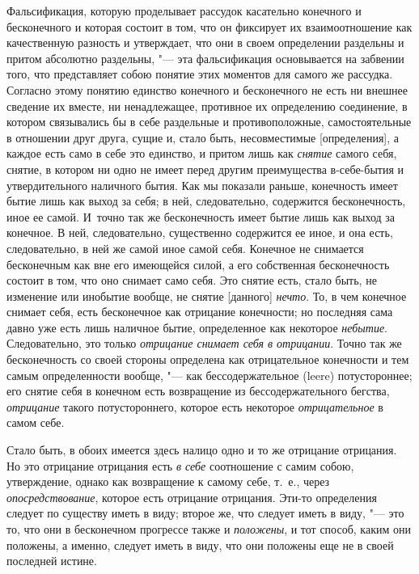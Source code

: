 Фальсификация, которую проделывает рассудок касательно конечного и
бесконечного и которая состоит в том, что он фиксирует их взаимоотношение
как качественную разность и утверждает, что они в своем определении
раздельны и притом абсолютно раздельны, "--- эта фальсификация основывается на
забвении того, что представляет собою понятие этих моментов для самого же
рассудка. Согласно этому понятию единство конечного и бесконечного не есть
ни внешнее сведение их вместе, ни ненадлежащее, противное их определению
соединение, в котором связывались бы в себе раздельные и противоположные,
самостоятельные в отношении друг друга, сущие и, стало быть, несовместимые
[определения], а каждое есть само в себе это единство, и притом лишь как
{\em снятие} самого себя, снятие, в котором ни одно не
имеет перед другим преимущества в-себе-бытия и утвердительного наличного
бытия. Как мы показали раньше, конечность имеет бытие лишь как выход за
себя; в ней, следовательно, содержится бесконечность, иное ее самой.
И~точно так же бесконечность имеет бытие лишь как выход за конечное. В ней,
следовательно, существенно содержится ее иное, и она есть, следовательно,
в ней же самой иное самой себя. Конечное не снимается бесконечным как вне
его имеющейся силой, а его собственная бесконечность состоит в том, что оно
снимает само себя. Это снятие есть, стало быть, не изменение или инобытие
вообще, не снятие [данного] {\em нечто}. То, в чем
конечное снимает себя, есть бесконечное как отрицание конечности; но
последняя сама давно уже есть лишь наличное бытие, определенное как
некоторое {\em небытие}. Следовательно, это только
{\em отрицание снимает себя в отрицании}. Точно так же
бесконечность со своей стороны определена как отрицательное конечности и
тем самым определенности вообще, "--- как бессодержательное (leere)
потустороннее; его снятие себя в конечном есть возвращение из
бессодержательного бегства, {\em отрицание} такого
потустороннего, которое есть некоторое
{\em отрицательное} в самом себе.

Стало быть, в обоих имеется здесь налицо одно и то же отрицание отрицания.
Но это отрицание отрицания есть {\em в себе}
соотношение с самим собою, утверждение, однако как возвращение к самому
себе, т.~е., через {\em опосредствование}, которое есть
отрицание отрицания. Эти-то определения следует по существу иметь в виду;
второе же, что следует иметь в виду, "--- это то, что они в бесконечном
прогрессе также и {\em положены}, и тот способ, каким
они положены, а именно, следует иметь в виду, что они положены еще не в
своей последней истине.

